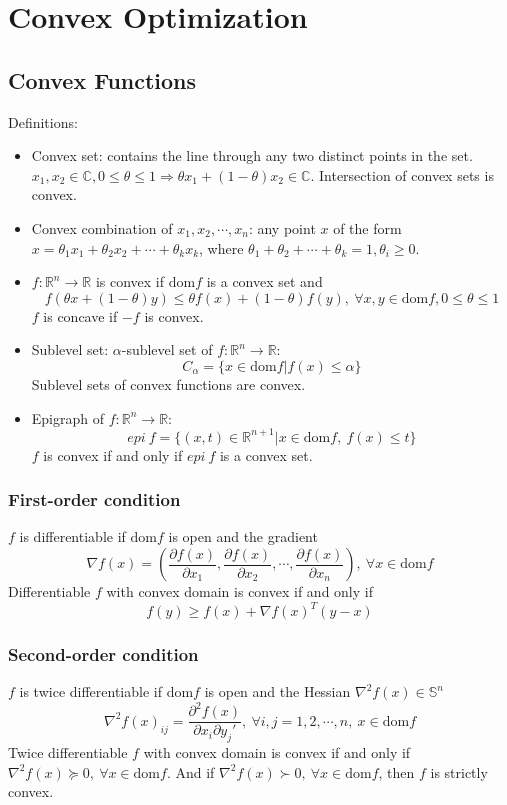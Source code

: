 \chapter{Convex Optimization}
\section{Convex Functions}
Definitions: 
\begin{itemize}
    \item Convex set: contains the line through any two distinct points in the set. $x_1, x_2 \in \mathbb{C}, 0 \le \theta \le 1 \Rightarrow \theta x_1 + (1 - \theta)x_2 \in \mathbb{C}$. Intersection of convex sets is convex.
    \item Convex combination of $x_1, x_2, \cdots, x_n$: any point $x$ of the form $x = \theta_1x_1 + \theta_2x_2 + \cdots + \theta_kx_k$, where $\theta_1 + \theta_2 + \cdots + \theta_k = 1, \theta_i \ge 0$.
    \item $f: \mathbb{R}^n \rightarrow \mathbb{R}$ is convex if $\text{dom} f$ is a convex set and 
    $$
    f(\theta x + (1 - \theta)y) \le \theta f(x) + (1 - \theta)f(y), \ \forall x, y \in \text{dom} f, 0 \le \theta \le 1
    $$
    $f$ is concave if $-f$ is convex.
    \item Sublevel set: $\alpha$-sublevel set of $f: \mathbb{R}^n \rightarrow \mathbb{R}$:
    $$
    C_{\alpha} = \{x \in \text{dom} f | f(x) \le \alpha\}
    $$
    Sublevel sets of convex functions are convex.
    \item Epigraph of $f: \mathbb{R}^n \rightarrow \mathbb{R}$: 
    $$
    epi \ f = \{(x, t) \in \mathbb{R}^{n + 1} | x \in \text{dom} f, \ f(x) \le t\}
    $$
    $f$ is convex if and only if $epi \ f$ is a convex set.
\end{itemize}
\subsection{First-order condition}
$f$ is differentiable if $\text{dom} f$ is open and the gradient
$$
\nabla f(x) = (\frac{\partial f(x)}{\partial x_1}, \frac{\partial f(x)}{\partial x_2}, \cdots, \frac{\partial f(x)}{\partial x_n}), \ \forall x \in \text{dom} f
$$
Differentiable $f$ with convex domain is convex if and only if 
$$
f(y) \ge f(x) + \nabla f(x)^T(y - x)
$$

\subsection{Second-order condition}
$f$ is twice differentiable if $\text{dom} f$ is open and the Hessian $\nabla^2 f(x) \in \mathbb{S}^n$
$$
\nabla^2 f(x)_{ij} = \frac{\partial^2 f(x)}{\partial x_i \partial y_j'}, \ \forall i, j = 1, 2, \cdots, n, \ x \in \text{dom} f
$$
Twice differentiable $f$ with convex domain is convex if and only if $\nabla^2 f(x) \succcurlyeq 0, \ \forall x \in \text{dom} f$. And if $\nabla^2 f(x) \succ 0, \ \forall x \in \text{dom} f$, then $f$ is strictly convex.

